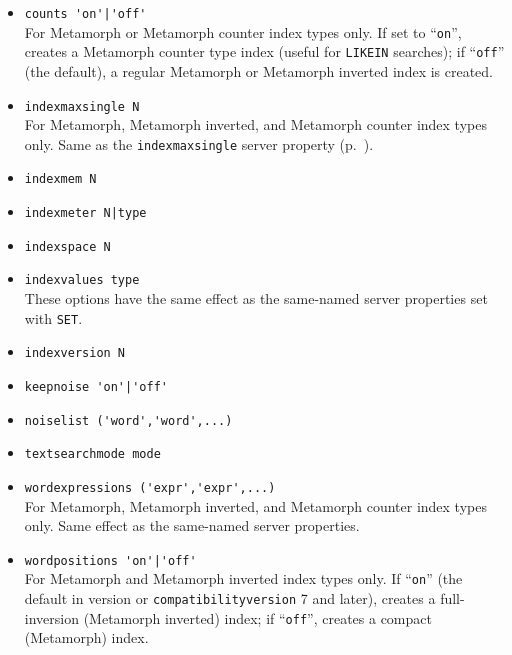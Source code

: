 \begin{itemize}
  \item \verb`counts 'on'|'off'` \\

    For Metamorph or Metamorph counter index types only.  If set to
    ``\verb`on`'', creates a Metamorph counter type index (useful for
    \verb`LIKEIN` searches); if ``\verb`off`'' (the default), a
    regular Metamorph or Metamorph inverted index is created.

  \item \verb`indexmaxsingle N` \\

    For Metamorph, Metamorph inverted, and Metamorph counter index
    types only.  Same as the {\tt indexmaxsingle} server property
    (p.~\pageref{indexmaxsingle}).

  \item \verb`indexmem N` \\
  \item \verb`indexmeter N|type` \\
  \item \verb`indexspace N` \\
  \item \verb`indexvalues type` \\

    These options have the same effect as the same-named server
    properties set with {\tt SET}.

  \item \verb`indexversion N` \\
  \item \verb`keepnoise 'on'|'off'` \\
  \item \verb`noiselist ('word','word',...)` \\
  \item \verb`textsearchmode mode` \\
  \item \verb`wordexpressions ('expr','expr',...)` \\

    For Metamorph, Metamorph inverted, and Metamorph counter index
    types only.  Same effect as the same-named server properties.

  \item \verb`wordpositions 'on'|'off'` \\

    For Metamorph and Metamorph inverted index types only.  If
    ``\verb`on`'' (the default in version or
    \verb`compatibilityversion` 7 and later), creates a full-inversion
    (Metamorph inverted) index; if ``\verb`off`'', creates a compact
    (Metamorph) index.


\end{itemize}
